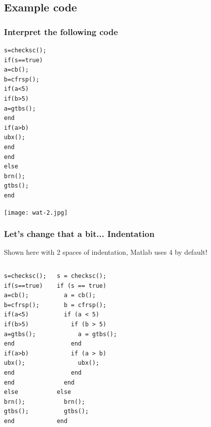 
\subsection*{Example code}
\begin{frame}[fragile]
 \frametitle{Interpret the following code}
 \begin{lstlisting}
s=checksc();
if(s==true)
a=cb();
b=cfrsp();
if(a<5)
if(b>5)
a=gtbs();
end
if(a>b)
ubx();
end
end
else
brn();
gtbs();
end
 \end{lstlisting}
\end{frame}

\begin{frame}[plain]
\texttt{[image: wat-2.jpg]}
\end{frame}

\begin{frame}[fragile]
 \frametitle{Let's change that a bit... Indentation}
 \pause
 Shown here with 2 spaces of indentation, Matlab uses 4 by default!
 \begin{columns}[T]
     \begin{lstlisting}
s=checksc();
if(s==true)
a=cb();
b=cfrsp();
if(a<5)
if(b>5)
a=gtbs();
end
if(a>b)
ubx();
end
end
else
brn();
gtbs();
end
 \end{lstlisting}
     \begin{lstlisting}
s = checksc();
if (s == true)
  a = cb();
  b = cfrsp();
  if (a < 5)
    if (b > 5)
      a = gtbs();
    end
    if (a > b)
      ubx();
    end
  end
else
  brn();
  gtbs();
end
 \end{lstlisting}
 \end{columns}
\end{frame}


